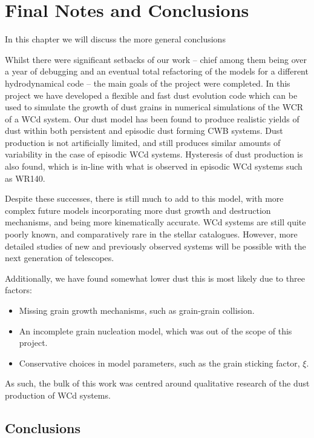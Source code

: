 \chapter{Final Notes and Conclusions}

In this chapter we will discuss the more general conclusions 

Whilst there were significant setbacks of our work -- chief among them being over a year of debugging and an eventual total refactoring of the models for a different hydrodynamical code -- the main goals of the project were completed.
In this project we have developed a flexible and fast dust evolution code which can be used to simulate the growth of dust grains in numerical simulations of the WCR of a WCd system.
Our dust model has been found to produce realistic yields of dust within both persistent and episodic dust forming CWB systems.
Dust production is not artificially limited, and still produces similar amounts of variability in the case of episodic WCd systems.
Hysteresis of dust production is also found, which is in-line with what is observed in episodic WCd systems such as WR140.

Despite these successes, there is still much to add to this model, with more complex future models incorporating more dust growth and destruction mechanisms, and being more kinematically accurate.
WCd systems are still quite poorly known, and comparatively rare in the stellar catalogues.
However, more detailed studies of new and previously observed systems will be possible with the next generation of telescopes.

Additionally, we have found somewhat lower dust 
this is most likely due to three factors:

\begin{itemize}
  \item Missing grain growth mechanisms, such as grain-grain collision.
  \item An incomplete grain nucleation model, which was out of the scope of this project.
  \item Conservative choices in model parameters, such as the grain sticking factor, $\xi$.
\end{itemize}

\noindent
As such, the bulk of this work was centred around qualitative research of the dust production of WCd systems.

\section{Conclusions}

